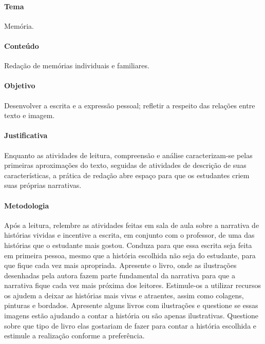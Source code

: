 \documentclass[11pt]{extarticle}
\begin{document}
\paragraph{Tema} Memória. 

\paragraph{Conteúdo} Redação de memórias individuais e familiares. 

\paragraph{Objetivo} Desenvolver a escrita e a expressão pessoal; refletir a respeito das relações entre texto e imagem.

\paragraph{Justificativa} Enquanto as atividades de leitura, compreensão e análise caracterizam-se pelas primeiras aproximações do texto, seguidas de atividades de descrição de suas características, a prática de redação abre espaço para que os estudantes criem suas próprias narrativas. 

\paragraph{Metodologia}

Após a leitura, relembre as atividades feitas em sala de aula sobre a narrativa de histórias vividas e incentive a escrita, em conjunto com o professor, de uma das histórias que o estudante mais gostou. Conduza para que essa escrita seja feita em primeira pessoa, mesmo que a história escolhida não seja do estudante, para que fique cada vez mais apropriada. Apresente o livro, onde as ilustrações desenhadas pela autora fazem parte fundamental da narrativa para que a narrativa fique cada vez mais próxima dos leitores. Estimule-os a utilizar recursos os ajudem a deixar as histórias mais vivas e atraentes, assim como colagens, pinturas e bordados. Apresente alguns livros com ilustrações e questione se essas imagens estão ajudando a contar a história ou são apenas ilustrativas. Questione sobre que tipo de livro elas gostariam de fazer para contar a história escolhida e estimule a realização conforme a preferência. 

\end{document}

